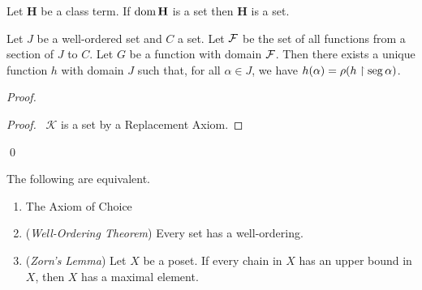\begin{axioms}[Replacement]
    Let $\mathbf{H}$ be a class term. If $\operatorname{dom} \mathbf{H}$ is a set
    then $\mathbf{H}$ is a set.
\end{axioms}

\begin{theorem}
    Let $J$ be a well-ordered set and $C$ a set. Let $\mathcal{F}$ be the set of all functions from a section of $J$ to $C$.
    Let $G$ be a function with domain $\mathcal{F}$. Then there exists a unique function $h$ with domain $J$
    such that, for all $\alpha \in J$,
    we have $h(\alpha) = \rho(h \restriction \operatorname{seg} \alpha)$.
\end{theorem}

\begin{proof}
    \pf
    \begin{proof}
        \pf\ $\mathcal{K}$ is a set by a Replacement Axiom.
    \end{proof}
    \qed
\end{proof}

\begin{theorem}
    The following are equivalent.
    \begin{enumerate}
        \item The Axiom of Choice
        \item (\emph{Well-Ordering Theorem}) Every set has a well-ordering.
        \item (\emph{Zorn's Lemma}) Let $X$ be a poset. If every chain in $X$ has 
        an upper bound in $X$, then $X$ has a maximal element.
    \end{enumerate}
\end{theorem}

